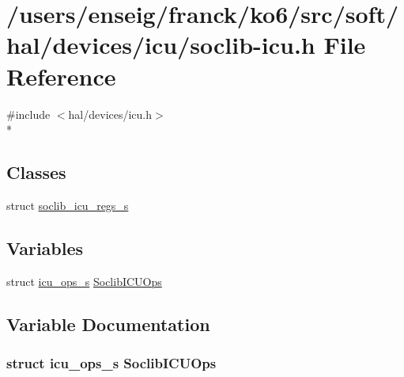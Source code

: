 \hypertarget{icu_2soclib-icu_8h}{\section{/users/enseig/franck/ko6/src/soft/hal/devices/icu/soclib-\/icu.h File Reference}
\label{icu_2soclib-icu_8h}
}
{\ttfamily \#include $<$hal/devices/icu.\-h$>$}\\*
\subsection*{Classes}
\begin{DoxyCompactItemize}
\item 
struct \hyperlink{structsoclib__icu__regs__s}{soclib\-\_\-icu\-\_\-regs\-\_\-s}
\end{DoxyCompactItemize}
\subsection*{Variables}
\begin{DoxyCompactItemize}
\item 
struct \hyperlink{structicu__ops__s}{icu\-\_\-ops\-\_\-s} \hyperlink{icu_2soclib-icu_8h_a57148fb85883dc5ca0480a7b55398c58}{Soclib\-I\-C\-U\-Ops}
\end{DoxyCompactItemize}


\subsection{Variable Documentation}
\hypertarget{icu_2soclib-icu_8h_a57148fb85883dc5ca0480a7b55398c58}{
\subsubsection[{Soclib\-I\-C\-U\-Ops}]{\setlength{\rightskip}{0pt plus 5cm}struct {\bf icu\-\_\-ops\-\_\-s} Soclib\-I\-C\-U\-Ops}}\label{icu_2soclib-icu_8h_a57148fb85883dc5ca0480a7b55398c58}
